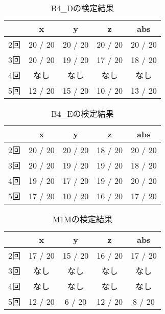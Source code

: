         \begin{table}[tb]
            \caption{B4_Dの検定結果}
            \vspace{0.5cm}
            \centering
            \begin{tabular}{|c|c|c|c|c|}
                \hline
                \diagbox{}{} & x & y & z & abs \\\hline
                2回 & 20 / 20 & 20 / 20 & 20 / 20 & 20 / 20 \\
                3回 & 20 / 20 & 19 / 20 & 17 / 20 & 18 / 20 \\
                4回 & なし & なし & なし & なし \\
                5回 & 12 / 20 & 15 / 20 & 10 / 20 & 13 / 20 \\
                \hline
            \end{tabular}
        \end{table}
        \begin{table}[tb]
            \caption{B4_Eの検定結果}
            \vspace{0.5cm}
            \centering
            \begin{tabular}{|c|c|c|c|c|}
                \hline
                \diagbox{}{} & x & y & z & abs \\\hline
                2回 & 20 / 20 & 20 / 20 & 18 / 20 & 20 / 20 \\
                3回 & 20 / 20 & 19 / 20 & 19 / 20 & 18 / 20 \\
                4回 & 19 / 20 & 17 / 20 & 19 / 20 & 20 / 20 \\
                5回 & 17 / 20 & 10 / 20 & 16 / 20 & 17 / 20 \\
                \hline
            \end{tabular}
        \end{table}
        \begin{table}[tb]
            \caption{M1Mの検定結果}
            \vspace{0.5cm}
            \centering
            \begin{tabular}{|c|c|c|c|c|}
                \hline
                \diagbox{}{} & x & y & z & abs \\\hline
                2回 & 17 / 20 & 15 / 20 & 16 / 20 & 17 / 20 \\
                3回 & なし & なし & なし & なし \\
                4回 & なし & なし & なし & なし \\
                5回 & 12 / 20 & 6 / 20 & 12 / 20 & 8 / 20 \\
                \hline
            \end{tabular}
        \end{table}
